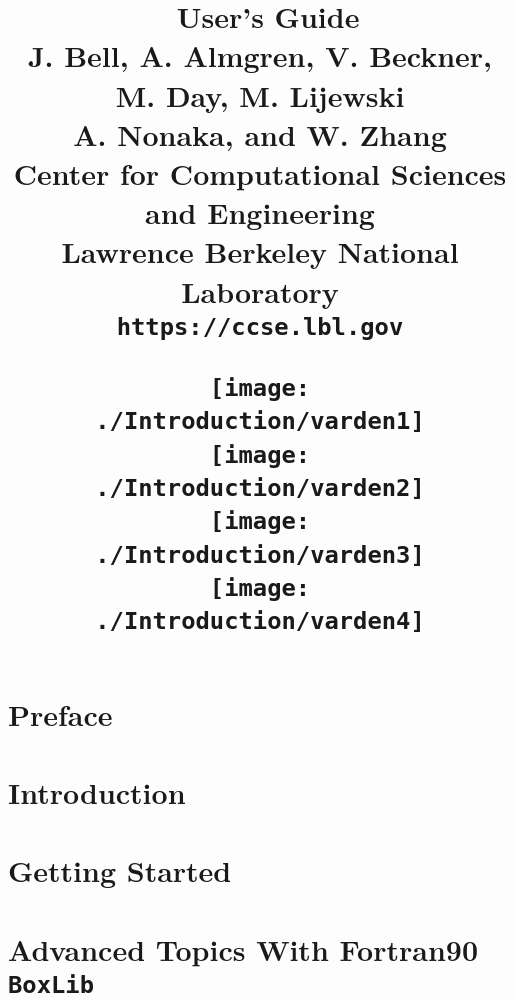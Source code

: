 \documentclass[11pt]{book}
\title{\Huge{\bf \BoxLib\ User's Guide}\\
       \vspace{0.5in}
       \Large{J. Bell, A. Almgren, V. Beckner, M. Day, M. Lijewski}\\
       \Large{A. Nonaka, and W. Zhang}\\
\vspace{0.25in}
       \Large{Center for Computational Sciences and Engineering}\\
       \Large{Lawrence Berkeley National Laboratory}\\
       \Large{\tt https://ccse.lbl.gov}
\begin{figure}[b]
\centering
\texttt{[image: ./Introduction/varden1]}
\texttt{[image: ./Introduction/varden2]}\\
\texttt{[image: ./Introduction/varden3]}
\texttt{[image: ./Introduction/varden4]}
\end{figure}
}
\makeatletter
\newcommand{\BoxLib}{{\tt BoxLib}}
\renewcommand*\cleardoublepage{\clearpage\if@twoside
\ifodd\c@page\else
\hbox{}
\thispagestyle{empty}
\newpage
\if@twocolumn\hbox{}\newpage\fi\fi\fi}
\makeatother
\begin{document}
\frontmatter

\maketitle

\cleardoublepage

\setcounter{tocdepth}{1}
\tableofcontents

\cleardoublepage


\cleardoublepage

\chapter*{Preface}


\mainmatter

\chapter{Introduction}\label{Chap:Introduction}


\chapter{Getting Started}\label{Chap:Getting Started}


\chapter{Advanced Topics With Fortran90 \BoxLib}\label{Chap:Advanced Topics F}


%
\end{document}
